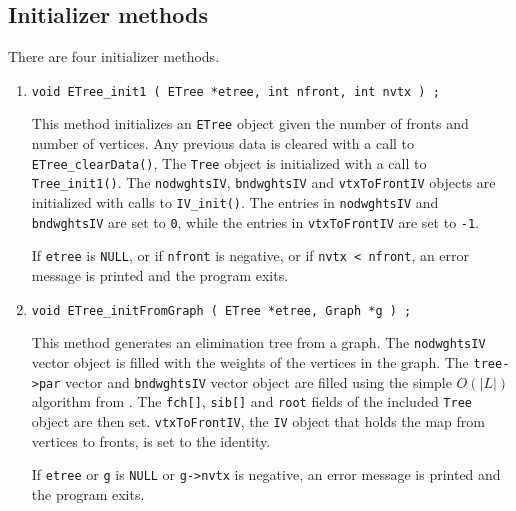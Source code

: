 \subsection{Initializer methods}
\label{subsection:ETree:proto:initializers}
\par
There are four initializer methods.
\par
\begin{enumerate}
\item
\begin{verbatim}
void ETree_init1 ( ETree *etree, int nfront, int nvtx ) ;
\end{verbatim}
This method initializes an {\tt ETree} object given the number of
fronts and number of vertices.
Any previous data is cleared with a call to 
{\tt ETree\_clearData()}, 
The {\tt Tree} object is initialized with a call to {\tt Tree\_init1()}.
The {\tt nodwghtsIV}, {\tt bndwghtsIV} and {\tt vtxToFrontIV} objects 
are initialized with calls to {\tt IV\_init()}.
The entries in {\tt nodwghtsIV} and {\tt bndwghtsIV} are set to {\tt 0},
while the entries in {\tt vtxToFrontIV} are set to {\tt -1}.
\par {}
If {\tt etree} is {\tt NULL}, or if {\tt nfront} is negative, 
or if {\tt nvtx < nfront},
an error message is printed and the program exits.
\item
\begin{verbatim}
void ETree_initFromGraph ( ETree *etree, Graph *g ) ;
\end{verbatim}
This method generates an elimination tree from a graph.
The {\tt nodwghtsIV} vector object is filled with the weights of the
vertices in the graph.
The {\tt tree->par} vector and {\tt bndwghtsIV} vector object 
are filled using the simple $O(|L|)$ algorithm from \cite{liu90-etree}.
The {\tt fch[]}, {\tt sib[]} and {\tt root} fields of the included
{\tt Tree} object are then set.
{\tt vtxToFrontIV}, the {\tt IV} object that holds the map from 
vertices to fronts, is set to the identity.
\par {}
If {\tt etree} or {\tt g} is {\tt NULL} or {\tt g->nvtx} is negative, 
an error message is printed and the program exits.

\end{enumerate}

